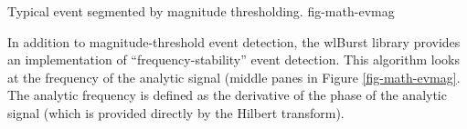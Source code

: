 {Typical event segmented by magnitude thresholding.}
{fig-math-evmag}

\FloatBarrier

In addition to magnitude-threshold event detection, the wlBurst library
provides an implementation of ``frequency-stability'' event detection. This
algorithm looks at the frequency of the analytic signal (middle panes in
Figure \ref{fig-math-evmag}. The analytic frequency is defined as the
derivative of the phase of the analytic signal (which is provided directly
by the Hilbert transform).

